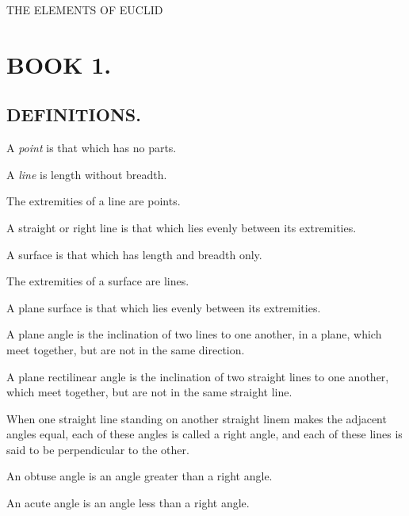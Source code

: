 		{
		\cleardoublepage%
		\let\clearpage\relax%
		{\hspace{48pt}\centering THE ELEMENTS OF EUCLID}%
		
		\chapter{BOOK 1.}\label{book1}
		}
		\pagestyle{euclidbasic}
		{\centering\section{DEFINITIONS.}
		\label{section\thesection}
		}
		\begin{bizarrelist}
			\item A \textit{point} is that which has no parts.\label{def1}
			\item A \textit{line} is length without breadth.\label{def2}
			\item The extremities of a line are points. \label{def3}
			\item A straight or right line is that which lies evenly between its 
                extremities.  \label{def4}
			\item A surface is that which has length and breadth only.   \label{def5}
			\item The extremities of a surface are lines.   \label{def6}
			\item A plane surface is that which lies evenly between its 
                extremities.    \label{def7}
			\item A plane angle is the inclination of two lines to one another, in 
                a plane, which meet together, but are not in the same 
                direction.     \label{def8}
			\item A plane rectilinear angle is the inclination of two straight 
                lines to one another, which meet together, but are not in 
                the same straight line.     \label{def9}
			\item When one straight line standing on another straight linem makes 
                the adjacent angles equal, each of these angles is called 
                a right angle, and each of these lines is said to be 
                perpendicular to the other.      \label{def10}
			\item An obtuse angle is an angle greater than a right angle.      
                \label{def11}
			\item An acute angle is an angle less than a right angle.       

\end{bizarrelist}
